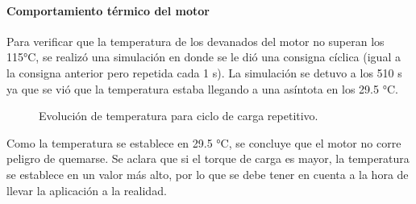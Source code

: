 \documentclass[a4paper, 10pt, onecolumn,journal]{ieeeconf}
\begin{document}
\paragraph{\textbf{Comportamiento térmico del motor}} 
Para verificar que la temperatura de los devanados del motor no superan los 115°C, se realizó una simulación en donde se le dió una consigna cíclica (igual a la consigna anterior pero repetida cada 1 s). La simulación se detuvo a los 510 s ya que se vió que la temperatura estaba llegando a una asíntota en los 29.5 °C.
\begin{figure}[H]
	\centering
	\begin{adjustbox}{max width=\columnwidth}
	\end{adjustbox}
	\caption{Evolución de temperatura para ciclo de carga repetitivo.}
	\label{Evolución de temperatura para ciclo de carga repetitivo}
\end{figure}
Como la temperatura se establece en  29.5 °C, se concluye que el motor no corre peligro de quemarse. Se aclara que si el torque de carga es mayor, la temperatura se establece en un valor más alto, por lo que se debe tener en cuenta a la hora de llevar la aplicación a la realidad.
\end{document}
